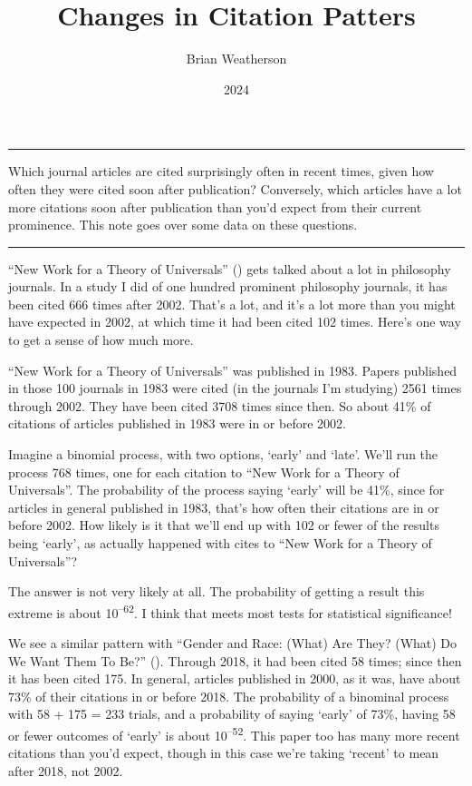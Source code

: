 \documentclass[
  10pt,
  letterpaper,
  DIV=11,
  numbers=noendperiod,
  twoside]{scrartcl}
\title{Changes in Citation Patters}
\author{Brian Weatherson}
\date{2024}
\renewenvironment{abstract}
 {\vspace{-1.25cm}
 \quotation\small\noindent\rule{\linewidth}{.5pt}\par\smallskip
 \noindent }
 {\par\noindent\rule{\linewidth}{.5pt}\endquotation}
\begin{document}
\maketitle
\begin{abstract}
Which journal articles are cited surprisingly often in recent times,
given how often they were cited soon after publication? Conversely,
which articles have a lot more citations soon after publication than
you'd expect from their current prominence. This note goes over some
data on these questions.
\end{abstract}


``New Work for a Theory of Universals''
() gets talked about a lot
in philosophy journals. In a study I did of one hundred prominent
philosophy journals, it has been cited 666 times after 2002. That's a
lot, and it's a lot more than you might have expected in 2002, at which
time it had been cited 102 times. Here's one way to get a sense of how
much more.

``New Work for a Theory of Universals'' was published in 1983. Papers
published in those 100 journals in 1983 were cited (in the journals I'm
studying) 2561 times through 2002. They have been cited 3708 times since
then. So about 41\% of citations of articles published in 1983 were in
or before 2002.

Imagine a binomial process, with two options, `early' and `late'. We'll
run the process 768 times, one for each citation to ``New Work for a
Theory of Universals''. The probability of the process saying `early'
will be 41\%, since for articles in general published in 1983, that's
how often their citations are in or before 2002. How likely is it that
we'll end up with 102 or fewer of the results being `early', as actually
happened with cites to ``New Work for a Theory of Universals''?

The answer is not very likely at all. The probability of getting a
result this extreme is about 10\textsuperscript{--62}. I think that
meets most tests for statistical significance!

We see a similar pattern with ``Gender and Race: (What) Are They? (What)
Do We Want Them To Be?'' (). Through 2018, it had been cited 58 times; since then it has been
cited 175. In general, articles published in 2000, as it was, have about
73\% of their citations in or before 2018. The probability of a
binominal process with 58 + 175 = 233 trials, and a probability of
saying `early' of 73\%, having 58 or fewer outcomes of `early' is about
10\textsuperscript{--52}. This paper too has many more recent citations
than you'd expect, though in this case we're taking `recent' to mean
after 2018, not 2002.
\end{document}

